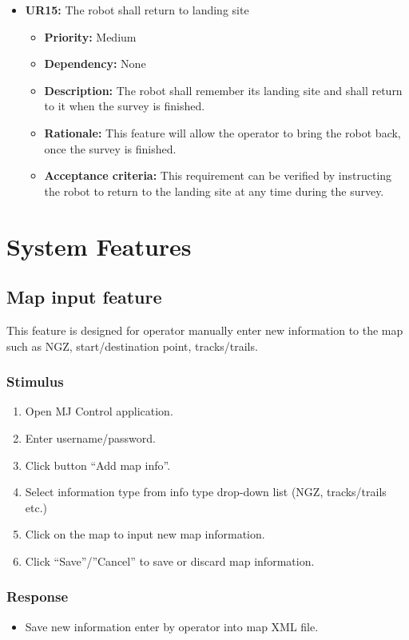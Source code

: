 \documentclass[10pt,a4paper,titlepage]{article}
\begin{document}
    \begin{itemize}
		\item \textbf{UR15:} The robot shall return to landing site
		\begin{itemize}
			\item \textbf{Priority:} Medium
            \item \textbf{Dependency:} None
			\item \textbf{Description:}   The robot shall remember its landing site and shall return to it when the survey is finished.
            \item \textbf{Rationale:}  This feature will allow the operator to bring the robot back, once the survey is finished.
            \item \textbf{Acceptance criteria:} This requirement can be verified by instructing the robot to return to the landing site at any time during the survey. 
		\end{itemize} 
	\end{itemize}
   
	
	\section{System Features}
	\subsection{Map input feature}
	This feature is designed for operator manually enter new information to the map such as NGZ, start/destination point, tracks/trails.
	
	\subsubsection*{Stimulus}
	\begin{enumerate}
		\item Open MJ Control application.
		\item Enter username/password.
		\item Click button “Add map info”.
		\item Select information type from info type drop-down list (NGZ, tracks/trails etc.)
		\item Click on the map to input new map information.
		\item Click “Save”/”Cancel” to save or discard map information.
	\end{enumerate}
	
	\subsubsection*{Response}
	\begin{itemize}
		\item Save new information enter by operator into map XML file.
	\end{itemize}
	
\end{document}
